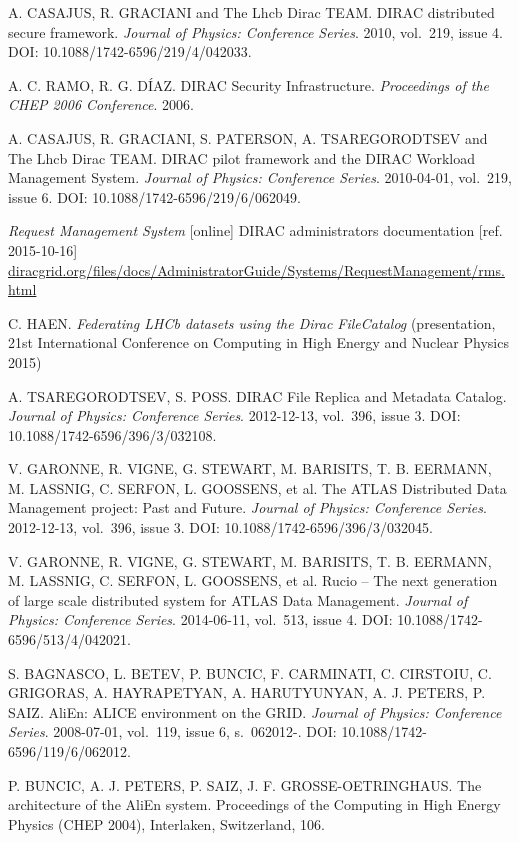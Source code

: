 \begin{thebibliography}{99}
	A. CASAJUS,  R. GRACIANI and The Lhcb Dirac TEAM. 
	DIRAC distributed secure framework. 
	\textit{Journal of Physics: Conference Series}. 2010, vol.~219, issue 4. 
	DOI: 10.1088/1742-6596/219/4/042033. 

	A. C. RAMO, R. G. DÍAZ. 
	DIRAC Security Infrastructure. 
	\textit{Proceedings of the CHEP 2006 Conference}. 2006. 
	
	A. CASAJUS, R. GRACIANI, S. PATERSON, A. TSAREGORODTSEV and The Lhcb Dirac TEAM. 
	DIRAC pilot framework and the DIRAC Workload Management System. 
	\textit{Journal of Physics: Conference Series}. 2010-04-01, vol.~219, issue 6. 
	DOI: 10.1088/1742-6596/219/6/062049. 
	
	\emph{Request Management System} [online] 
	DIRAC administrators documentation [ref. 2015-10-16]
	\url{diracgrid.org/files/docs/AdministratorGuide/Systems/RequestManagement/rms.html}
	
	C. HAEN.	
	\textit{Federating LHCb datasets using the Dirac FileCatalog}
	(presentation, 21st International Conference on Computing in High Energy and Nuclear Physics 2015)
	
	A. TSAREGORODTSEV, S. POSS. 
	DIRAC File Replica and Metadata Catalog. 
	\textit{Journal of Physics: Conference Series}. 2012-12-13, vol.~396, issue 3. 
	DOI: 10.1088/1742-6596/396/3/032108. 
	
	V. GARONNE, R. VIGNE, G. STEWART, M. BARISITS, T. B. EERMANN, M. LASSNIG, C. SERFON, L. GOOSSENS, et al. 
	The ATLAS Distributed Data Management project: Past and Future. 
	\textit{Journal of Physics: Conference Series}. 2012-12-13, vol.~396, issue 3.
	DOI: 10.1088/1742-6596/396/3/032045. 
	
	V. GARONNE, R. VIGNE, G. STEWART, M. BARISITS, T. B. EERMANN, M. LASSNIG, C. SERFON, L. GOOSSENS, et al. 
	Rucio – The next generation of large scale distributed system for ATLAS Data Management. 
	\textit{Journal of Physics: Conference Series}. 2014-06-11, vol.~513, issue 4.
	DOI: 10.1088/1742-6596/513/4/042021.
	
	S. BAGNASCO, L. BETEV, P. BUNCIC, F. CARMINATI, C. CIRSTOIU, C. GRIGORAS, A. HAYRAPETYAN, A. HARUTYUNYAN, 
	A. J. PETERS, P. SAIZ. 
	AliEn: ALICE environment on the GRID. 
	\textit{Journal of Physics: Conference Series}. 2008-07-01, vol.~119, issue 6, s.~062012-. 
	DOI: 10.1088/1742-6596/119/6/062012.

	P. BUNCIC, A. J. PETERS, P. SAIZ, J. F. GROSSE-OETRINGHAUS. 
	The architecture of the AliEn system. Proceedings of the Computing in High Energy Physics (CHEP 2004), 				
	Interlaken, Switzerland, 106.
	

\end{thebibliography}
